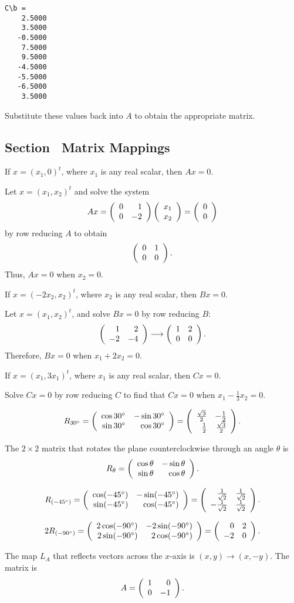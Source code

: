 \begin{verbatim}
C\b =
    2.5000
    3.5000
   -0.5000
    7.5000
    9.5000
   -4.5000
   -5.5000
   -6.5000
    3.5000
\end{verbatim}
Substitute these values back into $A$ to obtain the appropriate matrix.


\subsection*{Section~\protect{\ref{s:4.2}} Matrix Mappings}

\ans If $x = (x_1,0)^t$, where $x_1$ is any real scalar, then $Ax = 0$.

\soln Let $x = (x_1,x_2)^t$ and solve the system
\[
Ax = \left(\begin{array}{rr} 0 & 1\\ 0 &-2\end{array}\right)\left(\begin{array}{r} x_1 \\ x_2\end{array}\right) = \left(\begin{array}{r} 0 \\ 0\end{array}\right)
\]
by row reducing $A$ to obtain
\[
\left(\begin{array}{rr} 0 & 1\\ 0 &0\end{array}\right).
\]
Thus, $Ax = 0$ when $x_2 = 0$.

 \ans  If $x = (-2x_2,x_2)^t$, where $x_2$ is any real
scalar, then $Bx = 0$.

\soln Let $x = (x_1,x_2)^t$, and solve $Bx = 0$ by row reducing $B$:
\[
\left(\begin{array}{rr} 1 & 2\\ -2 &-4\end{array}\right) \longrightarrow \left(\begin{array}{rr} 1 & 2\\ 0 &0\end{array}\right).
\]
Therefore, $Bx = 0$ when $x_1 + 2x_2 = 0$.

\ans If $x = (x_1,3x_1)^t$, where $x_1$ is any real scalar, then $Cx = 0$.

\soln Solve $Cx = 0$ by row reducing $C$ to find that $Cx = 0$ when
$x_1 - \frac{1}{3}x_2 = 0$.

 \ans
\[ R_{30^\circ} = \left(\begin{array}{rr} \cos 30^\circ & -\sin 30^\circ\\ \sin 30^\circ &\cos 30^\circ\end{array}\right) =
\left(\begin{array}{rr} \frac{\sqrt{3}}{2} & -\frac{1}{2}\\ \frac{1}{2} &\frac{\sqrt{3}}{2}\end{array}\right).
\]

\soln The $2\times 2$ matrix that rotates the plane counterclockwise
through an angle $\theta$ is
\[
R_{\theta} = \left(\begin{array}{rr} \cos \theta & -\sin \theta\\ \sin \theta &\cos \theta\end{array}\right).
\]

\newpage
{} \ans
\[
R_{(-45^\circ)} = \left(\begin{array}{rr} \cos (-45^\circ) & -\sin
(-45^\circ)\\ \sin (-45^\circ) &\cos (-45^\circ)\end{array}\right) =
\left(\begin{array}{rr} \frac{1}{\sqrt{2}} & \frac{1}{\sqrt{2}}\\ -\frac{1}{\sqrt{2}} &\frac{1}{\sqrt{2}}\end{array}\right).
\]

 \ans
\[
2R_{(-90^\circ)} = \left(\begin{array}{rr} 2\cos (-90^\circ) & -2\sin
(-90^\circ)\\ 2\sin (-90^\circ) &2\cos (-90^\circ)\end{array}\right) = \left(\begin{array}{rr} 0 & 2\\ -2 &0\end{array}\right).
\]

 The map $L_A$ that reflects vectors across the $x$-axis is
$(x,y) \rightarrow (x,-y)$.  The matrix is
\[
A = \left(\begin{array}{rr} 1 & 0\\ 0 &-1\end{array}\right).
\]

